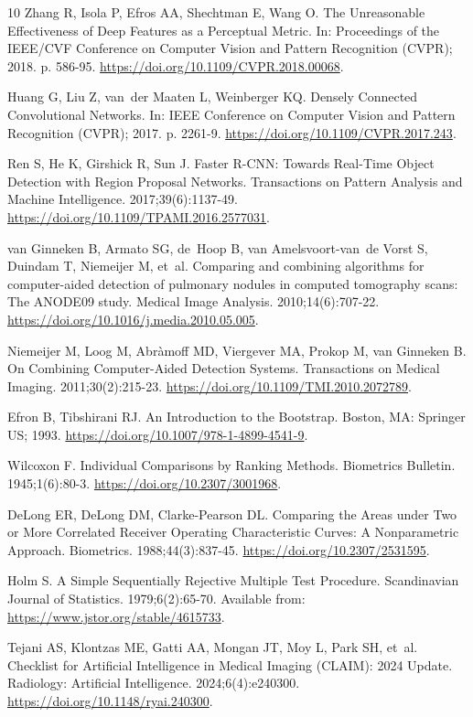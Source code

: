 \begin{thebibliography}{10}
Zhang R, Isola P, Efros AA, Shechtman E, Wang O.
\newblock The Unreasonable Effectiveness of Deep Features as a Perceptual
  Metric.
\newblock In: Proceedings of the {IEEE/CVF} Conference on Computer Vision and
  Pattern Recognition ({CVPR}); 2018. p. 586-95.
\newblock \url{https://doi.org/10.1109/CVPR.2018.00068}.

Huang G, Liu Z, van~der Maaten L, Weinberger KQ.
\newblock Densely Connected Convolutional Networks.
\newblock In: {IEEE} Conference on Computer Vision and Pattern Recognition
  ({CVPR}); 2017. p. 2261-9.
\newblock \url{https://doi.org/10.1109/CVPR.2017.243}.

Ren S, He K, Girshick R, Sun J.
\newblock Faster {R-CNN}: Towards Real-Time Object Detection with Region
  Proposal Networks.
 Transactions on Pattern Analysis and Machine Intelligence.
  2017;39(6):1137-49.
\newblock \url{https://doi.org/10.1109/TPAMI.2016.2577031}.

van Ginneken B, Armato SG, de~Hoop B, van Amelsvoort-van~de Vorst S, Duindam T,
  Niemeijer M, et~al.
\newblock Comparing and combining algorithms for computer-aided detection of
  pulmonary nodules in computed tomography scans: The {ANODE09} study.
\newblock Medical Image Analysis. 2010;14(6):707-22.
\newblock \url{https://doi.org/10.1016/j.media.2010.05.005}.

Niemeijer M, Loog M, Abr{\`a}moff MD, Viergever MA, Prokop M, van Ginneken B.
\newblock On Combining Computer-Aided Detection Systems.
 Transactions on Medical Imaging. 2011;30(2):215-23.
\newblock \url{https://doi.org/10.1109/TMI.2010.2072789}.

Efron B, Tibshirani RJ.
\newblock An Introduction to the Bootstrap.
\newblock Boston, MA: Springer US; 1993.
\newblock \url{https://doi.org/10.1007/978-1-4899-4541-9}.

Wilcoxon F.
\newblock Individual Comparisons by Ranking Methods.
\newblock Biometrics Bulletin. 1945;1(6):80-3.
\newblock \url{https://doi.org/10.2307/3001968}.

DeLong ER, DeLong DM, Clarke-Pearson DL.
\newblock Comparing the Areas under Two or More Correlated Receiver Operating
  Characteristic Curves: A Nonparametric Approach.
\newblock Biometrics. 1988;44(3):837-45.
\newblock \url{https://doi.org/10.2307/2531595}.

Holm S.
\newblock A Simple Sequentially Rejective Multiple Test Procedure.
\newblock Scandinavian Journal of Statistics. 1979;6(2):65-70.
\newblock Available from: \url{https://www.jstor.org/stable/4615733}.

Tejani AS, Klontzas ME, Gatti AA, Mongan JT, Moy L, Park SH, et~al.
\newblock Checklist for Artificial Intelligence in Medical Imaging ({CLAIM}):
  2024 Update.
\newblock Radiology: Artificial Intelligence. 2024;6(4):e240300.
\newblock \url{https://doi.org/10.1148/ryai.240300}.

\end{thebibliography}
